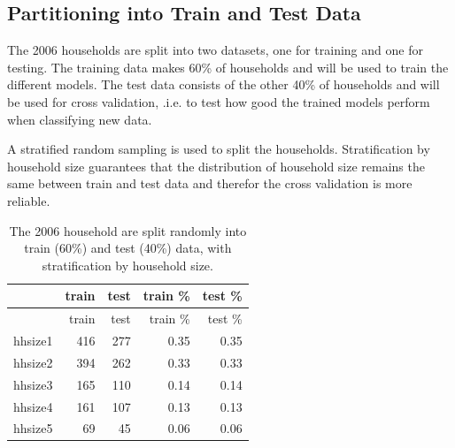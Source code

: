 \documentclass[]{article}
\newenvironment{Shaded}{\begin{snugshade}}{\end{snugshade}}
\newcommand{\DataTypeTok}[1]{\textcolor[rgb]{0.13,0.29,0.53}{#1}}
\newcommand{\DecValTok}[1]{\textcolor[rgb]{0.00,0.00,0.81}{#1}}
\newcommand{\FloatTok}[1]{\textcolor[rgb]{0.00,0.00,0.81}{#1}}
\newcommand{\KeywordTok}[1]{\textcolor[rgb]{0.13,0.29,0.53}{\textbf{#1}}}
\newcommand{\NormalTok}[1]{#1}
\newcommand{\OperatorTok}[1]{\textcolor[rgb]{0.81,0.36,0.00}{\textbf{#1}}}
\newcommand{\OtherTok}[1]{\textcolor[rgb]{0.56,0.35,0.01}{#1}}
\newcommand{\StringTok}[1]{\textcolor[rgb]{0.31,0.60,0.02}{#1}}
\begin{document}
\hypertarget{partitioning-into-train-and-test-data}{%
\subsection{Partitioning into Train and Test
Data}\label{partitioning-into-train-and-test-data}}

The 2006 households are split into two datasets, one for training and
one for testing. The training data makes 60\% of households and will be
used to train the different models. The test data consists of the other
40\% of households and will be used for cross validation, .i.e. to test
how good the trained models perform when classifying new data.

\begin{Shaded}
\end{Shaded}

A stratified random sampling is used to split the households.
Stratification by household size guarantees that the distribution of
household size remains the same between train and test data and therefor
the cross validation is more reliable.

\begin{longtable}[]{@{}lrrrr@{}}
\caption{\label{tab:tab6} The 2006 household are split randomly into
train (60\%) and test (40\%) data, with stratification by household
size.}\tabularnewline
\toprule
& train & test & train \% & test \%\tabularnewline
\midrule
\endfirsthead
\toprule
& train & test & train \% & test \%\tabularnewline
\midrule
\endhead
hhsize1 & 416 & 277 & 0.35 & 0.35\tabularnewline
hhsize2 & 394 & 262 & 0.33 & 0.33\tabularnewline
hhsize3 & 165 & 110 & 0.14 & 0.14\tabularnewline
hhsize4 & 161 & 107 & 0.13 & 0.13\tabularnewline
hhsize5 & 69 & 45 & 0.06 & 0.06\tabularnewline
\bottomrule
\end{longtable}
\end{document}
